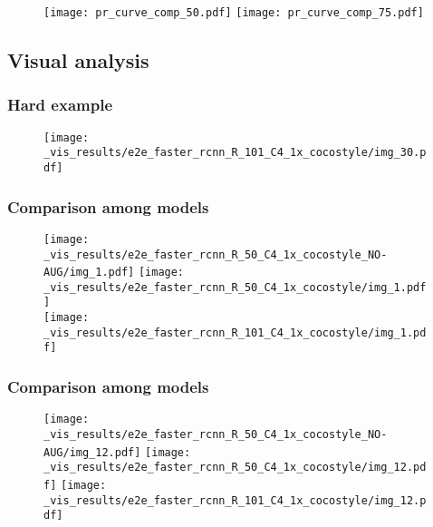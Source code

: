 \documentclass{beamer}
\begin{document}
		\begin{frame}%
			\begin{figure}[htb!]
				\centering
				\texttt{[image: pr\_curve\_comp\_50.pdf]}
				\texttt{[image: pr\_curve\_comp\_75.pdf]}
				\label{fig:prec-rec_curve}
			\end{figure}
		\end{frame}


	\subsection{Visual analysis}

		\begin{frame}\frametitle{Hard example}
			\begin{figure}[h!]
				\centering
				\texttt{[image: \_vis\_results/e2e\_faster\_rcnn\_R\_101\_C4\_1x\_cocostyle/img\_30.pdf]}
				\label{fig:hard}
			\end{figure}
		\end{frame}


		\begin{frame}\frametitle{Comparison among models}
			\begin{figure}[htb!]
				\centering
				\texttt{[image: \_vis\_results/e2e\_faster\_rcnn\_R\_50\_C4\_1x\_cocostyle\_NO-AUG/img\_1.pdf]}
				\texttt{[image: \_vis\_results/e2e\_faster\_rcnn\_R\_50\_C4\_1x\_cocostyle/img\_1.pdf]}\\
				\vspace{3mm}
				\texttt{[image: \_vis\_results/e2e\_faster\_rcnn\_R\_101\_C4\_1x\_cocostyle/img\_1.pdf]}
  			\label{fig:improv_1}
			\end{figure}
		\end{frame}


		\begin{frame}\frametitle{Comparison among models}
			\begin{figure}[htb!]
				\centering
				\texttt{[image: \_vis\_results/e2e\_faster\_rcnn\_R\_50\_C4\_1x\_cocostyle\_NO-AUG/img\_12.pdf]}
				\texttt{[image: \_vis\_results/e2e\_faster\_rcnn\_R\_50\_C4\_1x\_cocostyle/img\_12.pdf]}
				\vspace{3mm}
				\texttt{[image: \_vis\_results/e2e\_faster\_rcnn\_R\_101\_C4\_1x\_cocostyle/img\_12.pdf]}
  			\label{fig:improv_2}
			\end{figure}
		\end{frame}
\end{document}
